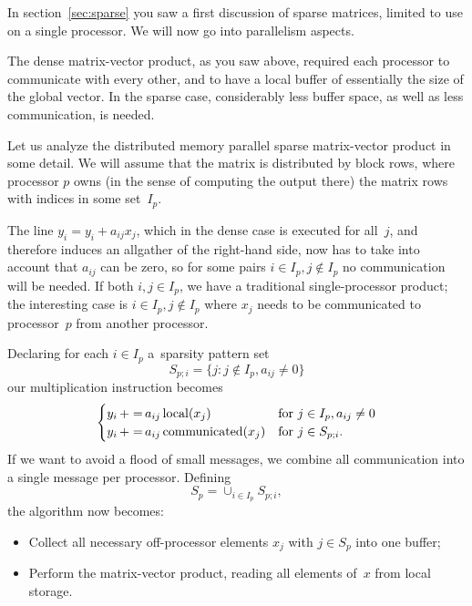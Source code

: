 
In section~\ref{sec:sparse} you saw a first discussion of sparse
matrices, limited to use on a single processor. We will now go into
parallelism aspects.

The dense matrix-vector product, as you saw above,
required each processor to communicate with every other, and to have a
local buffer of essentially the size of the global vector. In the
sparse case, considerably less buffer space, as well as less
communication, is needed.

Let us analyze the distributed memory
parallel sparse matrix-vector product in some detail.
We will assume
that the matrix is distributed by block rows, where processor $p$ owns
(in the sense of computing the output there)
the matrix rows with indices in some set~$I_p$.

The line $y_i=y_i+a_{ij}x_j$,
which in the dense case is executed for all~$j$,
and therefore induces an allgather
of the right-hand side,
now has to take into account that $a_{ij}$
can be zero,
so for some pairs $i\in I_p, j\not\in I_p$
no communication will be needed.
If both $i,j\in I_p$, we have a traditional single-processor product;
the interesting case is $i\in I_p,j\not\in I_p$
where $x_j$ needs to be communicated to processor~$p$ from another processor.

Declaring
for each $i\in I_p$ a~sparsity pattern set
\[ S_{p;i}=\{j\colon j\not\in I_p, a_{ij}\not=0\} \]
our multiplication instruction becomes
\[ 
\begin{cases}
  y_i\mathop{+=}a_{ij}\mathop{\mathrm{local}}(x_j)
  &\hbox{for $j\in I_p,a_{ij}\not=0$}\\
  y_i\mathop{+=}a_{ij}\mathop{\mathrm{communicated}}(x_j)
  &\hbox{for $j\in S_{p;i}$}.
\end{cases}
\]
If we want to avoid a flood of small messages, we combine
all communication into a single message per processor. Defining
\[ S_p = \cup_{i\in I_p} S_{p;i}, \]
the algorithm now becomes:
\begin{itemize}
\item Collect all necessary off-processor elements $x_j$ with $j\in
  S_p$ into one buffer;
\item Perform the matrix-vector product, reading all elements of~$x$
  from local storage.
\end{itemize}


